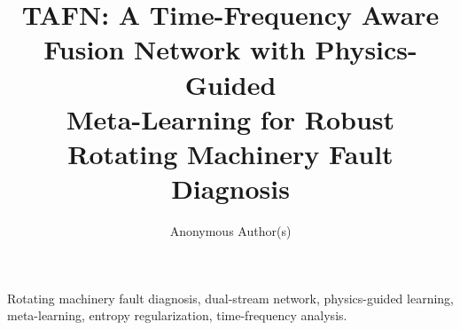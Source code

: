\documentclass[journal]{IEEEtran}
\begin{document}
\title{TAFN: A Time-Frequency Aware Fusion Network with Physics-Guided\\ Meta-Learning for Robust Rotating Machinery Fault Diagnosis}

\author{Anonymous Author(s)}

\maketitle

\begin{abstract}

\end{abstract}

\begin{IEEEkeywords}
Rotating machinery fault diagnosis, dual-stream network, physics-guided learning, meta-learning, entropy regularization, time-frequency analysis.
\end{IEEEkeywords}












\end{document}
